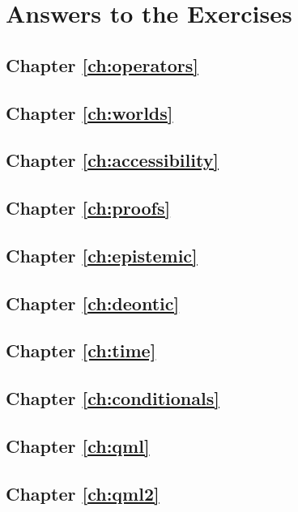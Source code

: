 \chapter{Answers to the Exercises}\label{ch:answers}

\section*{Chapter \ref{ch:operators}}

\printsolutions[chapter=1]

\newpage
\section*{Chapter \ref{ch:worlds}}

\printsolutions[chapter=2]

\newpage
\section*{Chapter \ref{ch:accessibility}}

\printsolutions[chapter=3]

\newpage
\section*{Chapter \ref{ch:proofs}}

\printsolutions[chapter=4]

\newpage
\section*{Chapter \ref{ch:epistemic}}

\printsolutions[chapter=5]

\newpage
\section*{Chapter \ref{ch:deontic}}

\printsolutions[chapter=6]

\newpage
\section*{Chapter \ref{ch:time}}

\printsolutions[chapter=7]

\newpage
\section*{Chapter \ref{ch:conditionals}}

\printsolutions[chapter=8]

\newpage
\section*{Chapter \ref{ch:qml}}

\printsolutions[chapter=9]

\newpage
\section*{Chapter \ref{ch:qml2}}

\printsolutions[chapter=10]

